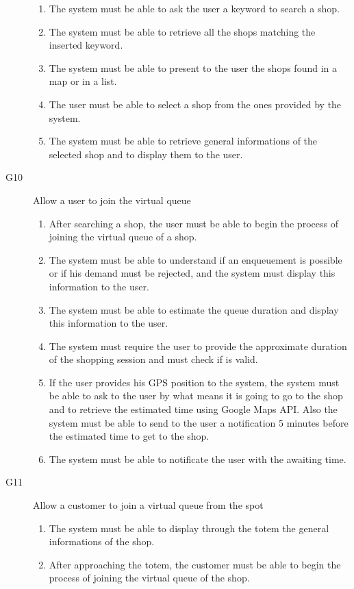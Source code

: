 \begin{description}
\begin{enumerate}[resume*]
            \item The system must be able to ask the user a keyword to search a shop.
            \item The system must be able to retrieve all the shops matching the inserted keyword.
            \item The system must be able to present to the user the shops found in a map or in a list.
            \item The user must be able to select a shop from the ones provided by the system.
            \item The system must be able to retrieve general informations of the selected shop and to display them to the user.
        \end{enumerate}
    \item [G10] Allow a user to join the virtual queue
        \begin{enumerate}[resume*]
            \item After searching a shop, the user must be able to begin the process of joining the virtual queue of a shop.
            \item The system must be able to understand if an enqueuement is possible or if his demand must be rejected, and the system must display this information to the user.
            \item The system must be able to estimate the queue duration and display this information to the user.
            \item The system must require the user to provide the approximate duration of the shopping session and must check if is valid.
            \item If the user provides his GPS position to the system, the system must be able to ask to the user by what means it is going to go to the shop and to retrieve the estimated time using Google Maps API. Also the system must be able to send to the user a notification 5 minutes before the estimated time to get to the shop.
            \item The system must be able to notificate the user with the awaiting time.
        \end{enumerate}
    \item [G11] Allow a customer to join a virtual queue from the spot
        \begin{enumerate}[resume*]
            \item The system must be able to display through the totem the general informations of the shop.
            \item After approaching the totem, the customer must be able to begin the process of joining the virtual queue of the shop.

\end{enumerate}
\end{description}
